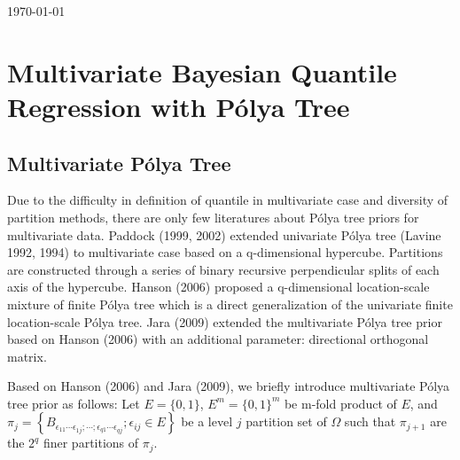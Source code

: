 \documentclass{article}
\date{\today}
\newcommand{\polya}{P\'{o}lya}
\begin{document}
\today

\section{Multivariate Bayesian Quantile Regression with \polya{} Tree}

\subsection{Multivariate \polya{} Tree}

Due to the difficulty in definition of quantile in multivariate case
and diversity of partition methods, there are only few literatures
about \polya{} tree priors for multivariate data. Paddock (1999, 2002)
extended univariate \polya{} tree (Lavine 1992, 1994) to multivariate
case based on a q-dimensional hypercube. Partitions are constructed
through a series of binary recursive perpendicular splits of each axis
of the hypercube. Hanson (2006) proposed a q-dimensional
location-scale mixture of finite \polya{} tree which is a direct
generalization of the univariate finite location-scale \polya{}
tree. Jara (2009) extended the multivariate \polya{} tree prior based
on Hanson (2006) with an additional parameter: directional orthogonal
matrix. 

Based on Hanson (2006) and Jara (2009), we briefly introduce
multivariate \polya{} tree prior as follows: Let $E=\{0,1\}$,
$E^m=\{0,1\}^m$ be m-fold product of $E$, and $\pi_j = \left\{
  B_{\epsilon_{11}\cdots
    \epsilon_{1j};\cdots;\epsilon_{q1}\cdots\epsilon_{qj}};
  \epsilon_{ij}\in E \right\}$ be a level $j$ partition set of
$\Omega$ such that $\pi_{j+1}$ are the $2^q$ finer partitions of
$\pi_j$. 
\end{document}
